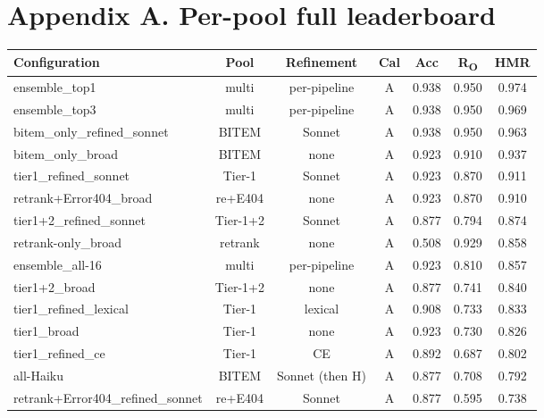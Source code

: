 \documentclass[11pt,a4paper]{article}
\newcommand{\HMR}{\textsc{HMR}}
\begin{document}



\appendix

\section*{Appendix A. Per-pool full leaderboard}

\begin{small}
\begin{tabular}{lcccccc}
\toprule
Configuration & Pool & Refinement & Cal & Acc & R\textsubscript{O} & \HMR \\
\midrule
ensemble\_top1     & multi    & per-pipeline      & A & 0.938 & 0.950 & 0.974 \\
ensemble\_top3     & multi    & per-pipeline      & A & 0.938 & 0.950 & 0.969 \\
bitem\_only\_refined\_sonnet     & BITEM    & Sonnet  & A & 0.938 & 0.950 & 0.963 \\
bitem\_only\_broad               & BITEM    & none    & A & 0.923 & 0.910 & 0.937 \\
tier1\_refined\_sonnet           & Tier-1   & Sonnet  & A & 0.923 & 0.870 & 0.911 \\
retrank+Error404\_broad          & re+E404  & none    & A & 0.923 & 0.870 & 0.910 \\
tier1+2\_refined\_sonnet         & Tier-1+2 & Sonnet  & A & 0.877 & 0.794 & 0.874 \\
retrank-only\_broad              & retrank  & none    & A & 0.508 & 0.929 & 0.858 \\
ensemble\_all-16                 & multi    & per-pipeline      & A & 0.923 & 0.810 & 0.857 \\
tier1+2\_broad                   & Tier-1+2 & none    & A & 0.877 & 0.741 & 0.840 \\
tier1\_refined\_lexical          & Tier-1   & lexical & A & 0.908 & 0.733 & 0.833 \\
tier1\_broad                     & Tier-1   & none    & A & 0.923 & 0.730 & 0.826 \\
tier1\_refined\_ce               & Tier-1   & CE      & A & 0.892 & 0.687 & 0.802 \\
all-Haiku                        & BITEM    & Sonnet (then H) & A & 0.877 & 0.708 & 0.792 \\
retrank+Error404\_refined\_sonnet & re+E404 & Sonnet  & A & 0.877 & 0.595 & 0.738 \\
\bottomrule
\end{tabular}
\end{small}
\end{document}
